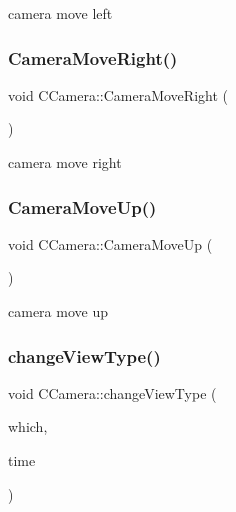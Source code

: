 camera move left 

\mbox{\label{class_c_camera_a80dc9119218e8f6fcd9c827a40c63e33}} 
\subsubsection{\texorpdfstring{CameraMoveRight()}{CameraMoveRight()}}
{\footnotesize\ttfamily void C\+Camera\+::\+Camera\+Move\+Right (\begin{DoxyParamCaption}{ }\end{DoxyParamCaption})}



camera move right 

\mbox{\label{class_c_camera_aaaaf41a9e27b36f79174113636c39e51}} 
\subsubsection{\texorpdfstring{CameraMoveUp()}{CameraMoveUp()}}
{\footnotesize\ttfamily void C\+Camera\+::\+Camera\+Move\+Up (\begin{DoxyParamCaption}{ }\end{DoxyParamCaption})}



camera move up 

\mbox{\label{class_c_camera_af19e4ea1747a31e2b1d6c4a3432aea03}} 
\subsubsection{\texorpdfstring{changeViewType()}{changeViewType()}}
{\footnotesize\ttfamily void C\+Camera\+::change\+View\+Type (\begin{DoxyParamCaption}\item[{\mbox{\hyperlink{class_c_camera_ae03c923f302a1ff2a7f85044b7352229}{E\+View\+State}}}]{which,  }\item[{double}]{time }\end{DoxyParamCaption})}



